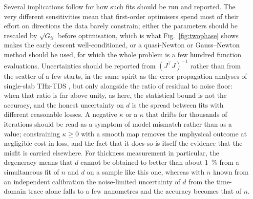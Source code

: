 \documentclass{optica-article}
\newcommand{\kap}{\kappa}
\begin{document}
Several implications follow for how such fits should be run and reported. The very different sensitivities mean that first-order optimisers spend most of their effort on directions the data barely constrain; either the parameters should be rescaled by $\sqrt{G_{ii}}$ before optimisation, which is what Fig.~\ref{fig:twophase} shows makes the early descent well-conditioned, or a quasi-Newton or Gauss--Newton method should be used, for which the whole problem is a few hundred function evaluations. Uncertainties should be reported from $(J^\top J)^{-1}$ \cite{Kay1993,Aster2018} rather than from the scatter of a few starts, in the same spirit as the error-propagation analyses of single-slab THz-TDS \cite{Withayachumnankul2008}, but only alongside the ratio of residual to noise floor: when that ratio is far above unity, as here, the statistical bound is not the accuracy, and the honest uncertainty on $d$ is the spread between fits with different reasonable losses. A negative $\kap$ or a $\kap$ that drifts for thousands of iterations should be read as a symptom of model mismatch rather than as a value; constraining $\kap\ge0$ with a smooth map removes the unphysical outcome at negligible cost in loss, and the fact that it does so is itself the evidence that the misfit is carried elsewhere. For thickness measurement in particular, the degeneracy means that $d$ cannot be obtained to better than about \SI{1}{\percent} from a simultaneous fit of $n$ and $d$ on a sample like this one, whereas with $n$ known from an independent calibration the noise-limited uncertainty of $d$ from the time-domain trace alone falls to a few nanometres and the accuracy becomes that of $n$.
\end{document}
